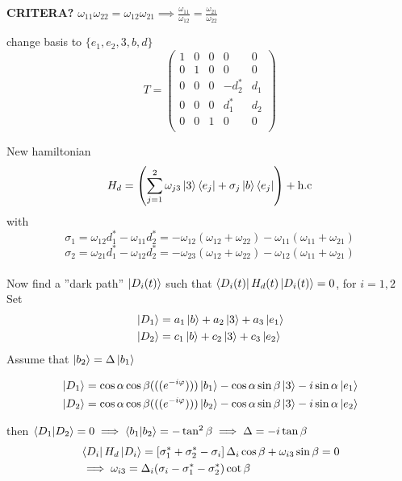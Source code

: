 \textbf{CRITERA?} $\omega_{11}\omega_{22} = \omega_{12}\omega_{21} \implies \frac{\omega_{11}}{\omega_{12}} = \frac{\omega_{21}}{\omega_{22}}$

change basis to $\{e_1, e_2, 3, b, d\}$
\begin{equation}
T = \begin{pmatrix}
1 & 0 & 0 & 0 & 0 \\
0 & 1 & 0 & 0 & 0  \\
0 & 0 & 0 & -d_2^{*} & d_1  \\
0 & 0 & 0 & d_1^{*} & d_2  \\
0 & 0 & 1 & 0 & 0  \\
\end{pmatrix}
\end{equation}


New hamiltonian 
\begin{equation}
H_d = \left(\sum_{j = 1}^{2} \omega_{j3}\ket{3}\bra{e_j} + \sigma_j\ket{b}\bra{e_j} \right) + \text{h.c}
\end{equation}
with 
$$
\sigma_1 = \omega_{12}d_1^{*} - \omega_{11}d_2^{*} = -\omega_{12}(\omega_{12} + \omega_{22}) - \omega_{11}(\omega_{11} + \omega_{21})
$$
$$
\sigma_2 = \omega_{21}d_1^{*}-\omega_{12}d_2^{*} = -\omega_{23}(\omega_{12} + \omega_{22}) - \omega_{12}(\omega_{11} + \omega_{21})
$$
\\
Now find a ''dark path'' $\ket{D_i(t)}$ such that $\bra{D_i(t)}H_d(t)\ket{D_i(t)} = 0$, for $i = 1,2$
\\ Set
\begin{equation}
\begin{aligned} &
 \ket{D_1} = a_1\ket{b} + a_2\ket{3} + a_3\ket{e_1}
 \\ &
 \ket{D_2} = c_1\ket{b} + c_2\ket{3} + c_3\ket{e_2}
 \end{aligned}
\end{equation}
Assume that $\ket{b_2} = \Delta\ket{b_1}$

\begin{equation}
\begin{aligned} &
 \ket{D_1} = \cos\alpha\cos\beta (((e^{-i\varphi})))\ket{b_1} - \cos\alpha\sin\beta\ket{3} - i\sin\alpha\ket{e_1}
 \\ &
 \ket{D_2} = \cos\alpha\cos\beta (((e^{-i\varphi})))\ket{b_2} - \cos\alpha\sin\beta\ket{3} - i\sin\alpha\ket{e_2}
 \end{aligned}
\end{equation}

then $\bra{D_1}\ket{D_2} = 0 \implies \bra{b_1}\ket{b_2} = - \tan^2\beta \implies \Delta = -i\tan\beta$ 
\begin{equation}
\begin{aligned}&
\bra{D_i}H_d\ket{D_i} = \left[\sigma_1^{*} + \sigma_2^{*} - \sigma_i\right]\Delta_i\cos\beta + \omega_{i3}\sin\beta = 0
\\ &
\implies \omega_{i3} = \Delta_i(\sigma_i - \sigma_1^{*} - \sigma_2^{*})\cot\beta
\end{aligned}
\end{equation}




